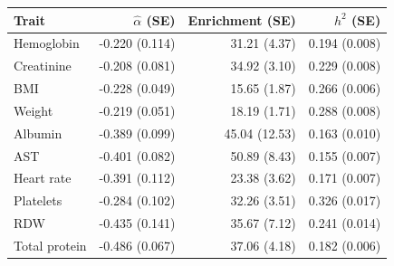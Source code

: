 \begin{tabular}{lrrr}
\toprule
Trait & $\widehat\alpha$ (SE) & Enrichment (SE) & $h^2$ (SE) \\
\midrule
Hemoglobin & -0.220 (0.114) & 31.21 (4.37) & 0.194 (0.008) \\
Creatinine & -0.208 (0.081) & 34.92 (3.10) & 0.229 (0.008) \\
BMI & -0.228 (0.049) & 15.65 (1.87) & 0.266 (0.006) \\
Weight & -0.219 (0.051) & 18.19 (1.71) & 0.288 (0.008) \\
Albumin & -0.389 (0.099) & 45.04 (12.53) & 0.163 (0.010) \\
AST & -0.401 (0.082) & 50.89 (8.43) & 0.155 (0.007) \\
Heart rate & -0.391 (0.112) & 23.38 (3.62) & 0.171 (0.007) \\
Platelets & -0.284 (0.102) & 32.26 (3.51) & 0.326 (0.017) \\
RDW & -0.435 (0.141) & 35.67 (7.12) & 0.241 (0.014) \\
Total protein & -0.486 (0.067) & 37.06 (4.18) & 0.182 (0.006) \\
\bottomrule
\end{tabular}
